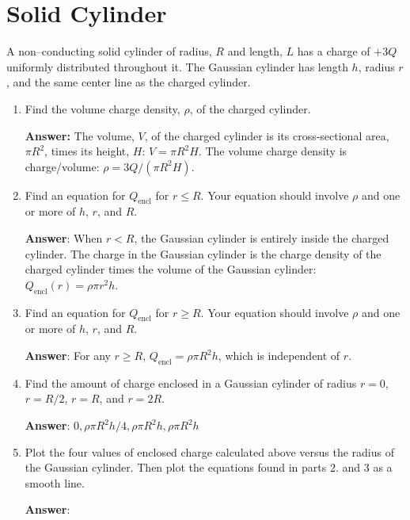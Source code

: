 \documentclass{article}
\begin{document}
\newpage

\section{Solid Cylinder}

A non--conducting solid cylinder of radius, $R$ and length, $L$ has a charge of $+3Q$ uniformly distributed throughout it. The Gaussian cylinder has length $h$, radius $r$, and the same center line as the charged cylinder.



\begin{enumerate}

  \item Find the volume charge density, $\rho$, of the charged cylinder.

        \ifsolutions
          \textbf{Answer:} The volume, $V$, of the charged cylinder is its cross-sectional area, $\pi R^2$, times its height, $H$: $V=\pi R^2 H$. The volume charge density is charge/volume: $\rho=3Q/(\pi R^2 H)$.
        \else
          \vskip 36.135pt
        \fi

  \item Find an equation for $Q_{\text{encl}}$ for $r\le R$. Your equation should involve $\rho$ and one or more of $h$, $r$, and $R$.

        \ifsolutions
          \textbf{Answer}: When $r<R$, the Gaussian cylinder is entirely inside the charged cylinder. The charge in the Gaussian cylinder is the charge density of the charged cylinder times the volume of the Gaussian cylinder: $Q_{\text{encl}}(r)=\rho \pi r^2 h$.
        \else
          \vskip 36.135pt
        \fi

  \item Find an equation for $Q_{\text{encl}}$ for $r\ge R$. Your equation should involve $\rho$ and one or more of $h$, $r$, and $R$.

        \ifsolutions
          \textbf{Answer}: For any $r\ge R$, $Q_{\text{encl}}=\rho \pi R^2 h$, which is independent of $r$. 
        \else
          \vskip 36.135pt
        \fi

  \item Find the amount of charge enclosed in a Gaussian cylinder of radius $r=0$, $r=R/2$, $r=R$, and $r=2R$.

        \ifsolutions
          \textbf{Answer}:  $0, \rho\pi R^2 h/4, \rho \pi R^2 h, \rho \pi R^2 h$
        \else
          \vskip 36.135pt
        \fi

  \item Plot the four values of enclosed charge calculated above versus the radius of the Gaussian cylinder. Then plot the equations found in parts 2. and 3 as a smooth line.

        \ifsolutions
          \textbf{Answer}:
        
          
        \fi

\end{enumerate}
\end{document}
